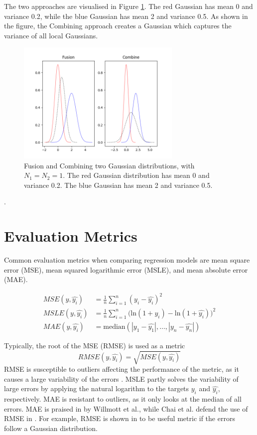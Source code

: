 The two approaches are visualised in Figure \ref{fig:aggregation}.
The red Gaussian has mean 0 and variance 0.2, while the blue Gaussian has mean 2 and variance 0.5.
As shown in the figure, the Combining approach creates a Gaussian which captures the variance of all local Gaussians.
\begin{figure} [h!]
    \centering
    \includegraphics[width=0.7\textwidth]{figures/aggregate_test}
    \caption[Fusion and Combining two Gaussian distributions]
    {\small Fusion and Combining two Gaussian distributions, with $N_1 = N_2 = 1$.
    The red Gaussian distribution has mean 0 and variance 0.2. 
    The blue Gaussian has mean 2 and variance 0.5.}
    \label{fig:aggregation}
\end{figure}

\cite{Tiger2018-gp-motion-pattern}.



\section{Evaluation Metrics}
Common evaluation metrics when comparing regression models are mean square error (MSE), mean squared logarithmic error (MSLE), and mean absolute error (MAE).

\begin{align}
    MSE(y, \hat{y_i}) &= \frac{1}{n} \sum_{i=1}^{n} (y_i - \hat{y_i})^2 \label{eq:rmse} \\
    MSLE(y, \hat{y_i}) &= \frac{1}{n} \sum_{i=1}^{n} \big( \textrm{ln}(1+y_i) - \textrm{ln}(1+\hat{y_i}) \big)^2 \label{eq:msle} \\
    MAE(y, \hat{y_i}) &= \textrm{median}(|y_1-\hat{y_1}|, \ldots, |y_n-\hat{y_n}|)\label{eq:mae}
\end{align}

Typically, the root of the MSE (RMSE) is used as a metric
\begin{equation}
    RMSE(y, \hat{y_i}) = \sqrt{MSE(y, \hat{y_i})}
\end{equation}
RMSE is susceptible to outliers affecting the performance of the metric, as it causes a large variability of the errors \cite{Willmott2005}.
MSLE partly solves the variability of large errors by applying the natural logarithm to the targets $y_i$ and $\hat{y_i}$, respectively.
MAE is resistant to outliers, as it only looks at the median of all errors.
MAE is praised in \cite{Willmott2005} by Willmott et al., while Chai et al. defend the use of RMSE in \cite{Chai2014}.
For example, RMSE is shown in \cite{Chai2014} to be useful metric if the errors follow a Gaussian distribution.

